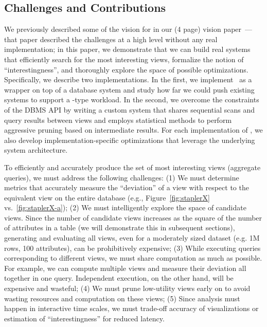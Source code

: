 \subsection*{Challenges and Contributions}

We previously described some of the vision for  \VizRecDB in our (4 page) vision 
paper~\cite{DBLP:conf/vldb/Parameswaran2013}---that paper described the challenges 
at a high level without any real implementation; 
in this paper, we demonstrate that we can build real systems that efficiently search for the most 
interesting views, formalize the notion of ``interestingness'', and thoroughly
explore the space of possible optimizations.
Specifically, we describe two implementations.
In the first, we implement \VizRecDB\ as a wrapper on top of a database system and study
how far we could push existing systems to support a \VizRecDB-type workload.
In the second, we overcome the constraints of the DBMS API by writing a custom system
that  shares sequential scans and query results between views and employs statistical methods to 
perform aggressive pruning
based on intermediate results.
For each implementation of \VizRecDB, we also develop implementation-specific
optimizations that leverage the underlying system architecture.

To efficiently and accurately produce the set of most interesting
views (aggregate queries), we must address the following challenges: 
(1) We must determine metrics that accurately measure the ``deviation'' of a
view with respect to the equivalent view on the entire database (e.g.,
Figure~\ref{fig:staplerX} vs.~\ref{fig:staplerX-a}); 
(2)  We must
intelligently explore the space of candidate views. Since the number of
candidate views increases as the square of the number of
attributes in a table (we will demonstrate this in subsequent sections),
generating and evaluating all views, even for a moderately sized dataset (e.g.
1M rows, 100 attributes), can be prohibitively expensive;
(3) While executing queries corresponding to different views, we must share
computation as much as possible. For example, 
we can compute multiple views and measure their deviation 
all together in one query. Independent execution,
on the other hand, will be expensive and wasteful;
(4) We must prune low-utility views early on to avoid wasting resources and
computation on these views; 
(5) Since analysis must happen in interactive time scales, we must trade-off
accuracy of visualizations or estimation of ``interestingness'' for reduced latency.


